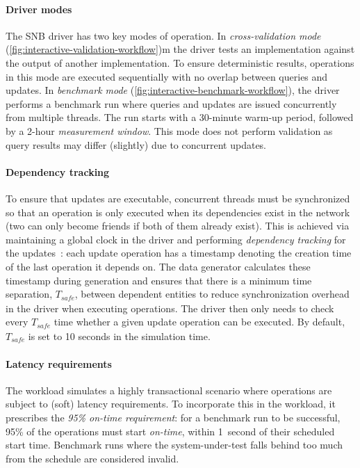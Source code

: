\paragraph{Driver modes}
%
The SNB driver has two key modes of operation.
In \emph{cross-validation mode} (\autoref{fig:interactive-validation-workflow})m
the driver tests an implementation against the output of another implementation.
To ensure deterministic results, operations in this mode are executed sequentially with no overlap between queries and updates.
In \emph{benchmark mode} (\autoref{fig:interactive-benchmark-workflow}),
the driver performs a benchmark run where queries and updates are issued concurrently from multiple threads.
The run starts with a 30-minute warm-up period, followed by a 2-hour \emph{measurement window}.
This mode does not perform validation as query results may differ (slightly) due to concurrent updates.

\paragraph{Dependency tracking}
%
To ensure that updates are executable, concurrent threads must be synchronized so that an operation is only executed when its dependencies exist in the network (\eg two \Persons can only become friends if both of them already exist).
This is achieved via maintaining a global clock in the driver and performing \emph{dependency tracking} for the updates~\cite{DBLP:conf/sigmod/ErlingALCGPPB15}: each update operation has a timestamp denoting the creation time of the last operation it depends on.
The data generator calculates these timestamp during generation and ensures that there is a minimum time separation,
$T_\textit{safe}$,
between dependent entities to reduce synchronization overhead in the driver when executing operations.
The driver then only needs to check every $T_\textit{safe}$ time whether a given update operation can be executed.
By default, $T_\textit{safe}$ is set to 10 seconds in the simulation time.

\paragraph{Latency requirements}
%
The workload simulates a highly transactional scenario where operations are subject to (soft) latency requirements.
To incorporate this in the workload, it prescribes the \emph{95\% on-time requirement}:
for a benchmark run to be successful, 95\% of the operations must start \emph{on-time}, \ie within 1~second of their scheduled start time.
Benchmark runs where the system-under-test falls behind too much from the schedule are considered invalid.

